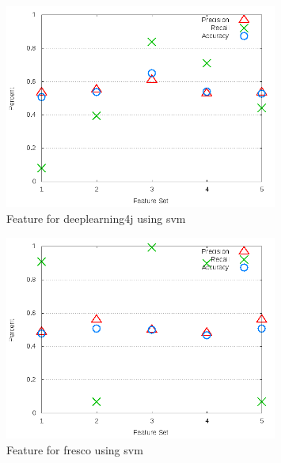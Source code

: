 \begin{figure}[!t]
\centering
\includegraphics[width=0.8\textwidth]{images/svm/test_3/deeplearning4j_sample_range.png}
\caption{Feature for deeplearning4j using \gls{svm}}
\label{fig:test_3_deeplearning4j_svm}
\end{figure}

\begin{figure}[!t]
\centering
\includegraphics[width=0.8\textwidth]{images/svm/test_3/fresco_sample_range.png}
\caption{Feature for fresco using \gls{svm}}
\label{fig:test_3_fresco_svm}
\end{figure}

